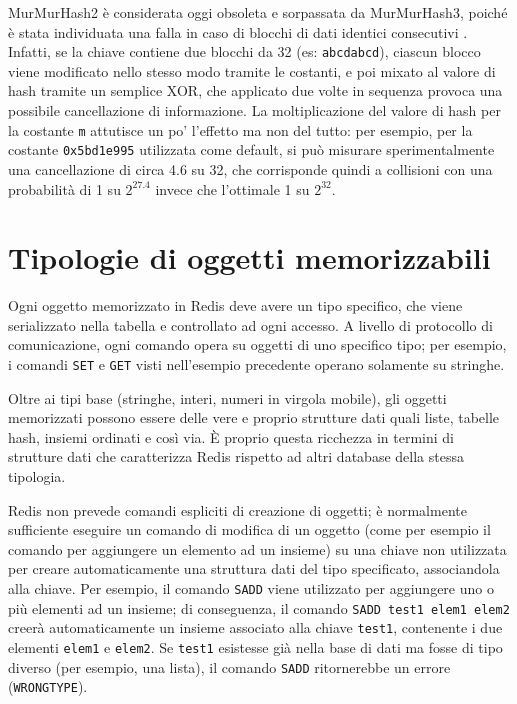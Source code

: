 MurMurHash2 è considerata oggi obsoleta e sorpassata da MurMurHash3, poiché è stata individuata una
falla in caso di blocchi di dati identici consecutivi \cite{murmur2flaw}. Infatti, se la chiave
contiene due blocchi da \SI{32}{\bit} (es: \verb|abcdabcd|), ciascun blocco viene modificato nello
stesso modo tramite le costanti, e poi mixato al valore di hash tramite un semplice XOR, che
applicato due volte in sequenza provoca una possibile cancellazione di informazione. La
moltiplicazione del valore di hash per la costante \verb|m| attutisce un po' l'effetto ma non del
tutto: per esempio, per la costante \verb|0x5bd1e995| utilizzata come default, si può misurare
sperimentalmente una cancellazione di circa \SI{4.6}{\bit} su \num{32}, che corrisponde quindi a
collisioni con una probabilità di \num{1} su $2 ^ {27.4}$ invece che l'ottimale \num{1} su $2 ^
{32}$.


\section{Tipologie di oggetti memorizzabili}

Ogni oggetto memorizzato in Redis deve avere un tipo specifico, che viene serializzato
nella tabella e controllato ad ogni accesso. A livello di protocollo di comunicazione,
ogni comando opera su oggetti di uno specifico tipo; per esempio, i comandi \verb|SET|
e \verb|GET| visti nell'esempio precedente operano solamente su stringhe.

Oltre ai tipi base (stringhe, interi, numeri in virgola mobile), gli oggetti memorizzati
possono essere delle vere e proprio strutture dati quali liste, tabelle hash, insiemi
ordinati e così via. È proprio questa ricchezza in termini di strutture dati che caratterizza
Redis rispetto ad altri database della stessa tipologia.

Redis non prevede comandi espliciti di creazione di oggetti; è normalmente sufficiente
eseguire un comando di modifica di un oggetto (come per esempio il comando per aggiungere
un elemento ad un insieme) su una chiave non utilizzata per creare automaticamente una
struttura dati del tipo specificato, associandola alla chiave. Per esempio, il comando
\verb|SADD| viene utilizzato per aggiungere uno o più elementi ad un insieme; di
conseguenza, il comando \verb|SADD test1 elem1 elem2| creerà automaticamente un insieme 
associato alla chiave \verb|test1|, contenente i due elementi \verb|elem1| e \verb|elem2|.
Se \verb|test1| esistesse già nella base di dati ma fosse di tipo diverso (per esempio,
una lista), il comando \verb|SADD| ritornerebbe un errore (\verb|WRONGTYPE|).

